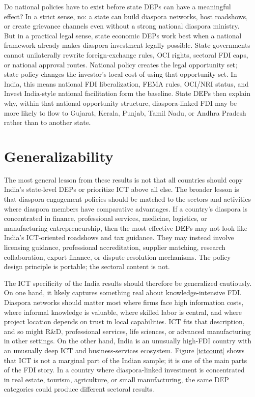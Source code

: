\documentclass[doublespace,nopageskip]{UVAthesis}
\begin{document}
Do national policies have to exist before state DEPs can have a meaningful effect? In a strict sense, no: a state can build diaspora networks, host roadshows, or create grievance channels even without a strong national diaspora ministry. But in a practical legal sense, state economic DEPs work best when a national framework already makes diaspora investment legally possible. State governments cannot unilaterally rewrite foreign-exchange rules, OCI rights, sectoral FDI caps, or national approval routes. National policy creates the legal opportunity set; state policy changes the investor's local cost of using that opportunity set. In India, this means national FDI liberalization, FEMA rules, OCI/NRI status, and Invest India-style national facilitation form the baseline. State DEPs then explain why, within that national opportunity structure, diaspora-linked FDI may be more likely to flow to Gujarat, Kerala, Punjab, Tamil Nadu, or Andhra Pradesh rather than to another state.

\section{Generalizability}

The most general lesson from these results is not that all countries should copy India's state-level DEPs or prioritize ICT above all else. The broader lesson is that diaspora engagement policies should be matched to the sectors and activities where diaspora members have comparative advantages. If a country's diaspora is concentrated in finance, professional services, medicine, logistics, or manufacturing entrepreneurship, then the most effective DEPs may not look like India's ICT-oriented roadshows and tax guidance. They may instead involve licensing guidance, professional accreditation, supplier matching, research collaboration, export finance, or dispute-resolution mechanisms. The policy design principle is portable; the sectoral content is not.

The ICT specificity of the India results should therefore be generalized cautiously. On one hand, it likely captures something real about knowledge-intensive FDI. Diaspora networks should matter most where firms face high information costs, where informal knowledge is valuable, where skilled labor is central, and where project location depends on trust in local capabilities. ICT fits that description, and so might R\&D, professional services, life sciences, or advanced manufacturing in other settings. On the other hand, India is an unusually high-FDI country with an unusually deep ICT and business-services ecosystem. Figure \ref{ictcount} shows that ICT is not a marginal part of the Indian sample; it is one of the main parts of the FDI story. In a country where diaspora-linked investment is concentrated in real estate, tourism, agriculture, or small manufacturing, the same DEP categories could produce different sectoral results.
\end{document}
